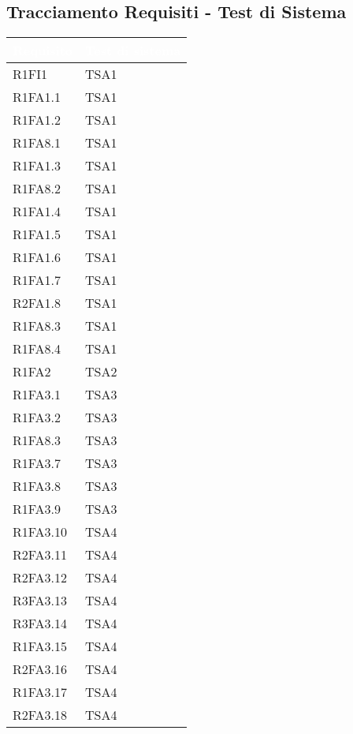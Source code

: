 \subsection{Tracciamento Requisiti - Test di Sistema}
{
\renewcommand{\arraystretch}{1.5}
\centering
\begin{longtable}{C{4cm} C{4cm}}
\textcolor{white}{\textbf{Requisito}} & \textcolor{white}{\textbf{Test di sistema}}\\	
\endhead

R1FI1 & TSA1  \\
R1FA1.1 & TSA1  \\
R1FA1.2 & TSA1  \\
R1FA8.1 & TSA1  \\
R1FA1.3 & TSA1  \\
R1FA8.2 & TSA1  \\
R1FA1.4 & TSA1  \\
R1FA1.5 & TSA1  \\
R1FA1.6 & TSA1  \\
R1FA1.7 & TSA1  \\
R2FA1.8 & TSA1  \\
R1FA8.3 & TSA1  \\
R1FA8.4 & TSA1  \\

R1FA2 & TSA2  \\

R1FA3.1 & TSA3  \\
R1FA3.2 & TSA3  \\
R1FA8.3 & TSA3  \\
R1FA3.7 & TSA3  \\
R1FA3.8 & TSA3  \\
R1FA3.9 & TSA3  \\

R1FA3.10 & TSA4  \\
R2FA3.11 & TSA4  \\
R2FA3.12 & TSA4  \\
R3FA3.13 & TSA4  \\
R3FA3.14 & TSA4  \\
R1FA3.15 & TSA4  \\
R2FA3.16 & TSA4  \\
R1FA3.17 & TSA4  \\
R2FA3.18 & TSA4  \\


\end{longtable}}
